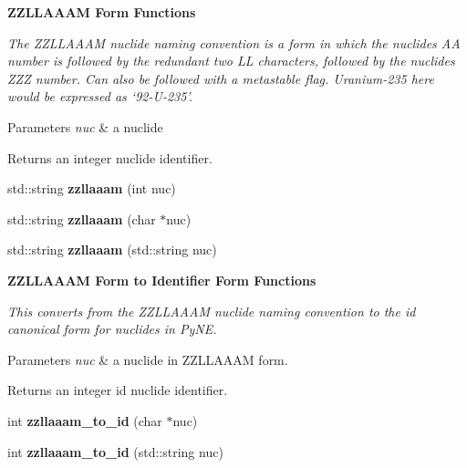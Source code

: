 \begin{Indent}{\bf Z\-Z\-L\-L\-A\-A\-A\-M Form Functions}\par
{\em The Z\-Z\-L\-L\-A\-A\-A\-M nuclide naming convention is a form in which the nuclides A\-A number is followed by the redundant two L\-L characters, followed by the nuclides Z\-Z\-Z number. Can also be followed with a metastable flag. Uranium-\/235 here would be expressed as ‘92-\/\-U-\/235’. 
\begin{DoxyParams}{Parameters}
{\em nuc} & a nuclide \\
\hline
\end{DoxyParams}
\begin{DoxyReturn}{Returns}
an integer nuclide identifier. 
\end{DoxyReturn}
}\begin{DoxyCompactItemize}
\item 
\hypertarget{namespacepyne_1_1nucname_ab11175f9aa7d8f9437b3b43531c94a89}{std\-::string {\bfseries zzllaaam} (int nuc)}\label{namespacepyne_1_1nucname_ab11175f9aa7d8f9437b3b43531c94a89}

\item 
\hypertarget{namespacepyne_1_1nucname_a07ef99280b627f85af2901604b3f6285}{std\-::string {\bfseries zzllaaam} (char $\ast$nuc)}\label{namespacepyne_1_1nucname_a07ef99280b627f85af2901604b3f6285}

\item 
\hypertarget{namespacepyne_1_1nucname_a3e184c78ba73f04348963e2158c32a8d}{std\-::string {\bfseries zzllaaam} (std\-::string nuc)}\label{namespacepyne_1_1nucname_a3e184c78ba73f04348963e2158c32a8d}

\end{DoxyCompactItemize}
\end{Indent}
\begin{Indent}{\bf Z\-Z\-L\-L\-A\-A\-A\-M Form to Identifier Form Functions}\par
{\em This converts from the Z\-Z\-L\-L\-A\-A\-A\-M nuclide naming convention to the id canonical form for nuclides in Py\-N\-E. 
\begin{DoxyParams}{Parameters}
{\em nuc} & a nuclide in Z\-Z\-L\-L\-A\-A\-A\-M form. \\
\hline
\end{DoxyParams}
\begin{DoxyReturn}{Returns}
an integer id nuclide identifier. 
\end{DoxyReturn}
}\begin{DoxyCompactItemize}
\item 
\hypertarget{namespacepyne_1_1nucname_a62543b28a461188a2872582314d4ee05}{int {\bfseries zzllaaam\-\_\-to\-\_\-id} (char $\ast$nuc)}\label{namespacepyne_1_1nucname_a62543b28a461188a2872582314d4ee05}

\item 
\hypertarget{namespacepyne_1_1nucname_a55b0daddcb0ff68650685e50c015f960}{int {\bfseries zzllaaam\-\_\-to\-\_\-id} (std\-::string nuc)}\label{namespacepyne_1_1nucname_a55b0daddcb0ff68650685e50c015f960}

\end{DoxyCompactItemize}
\end{Indent}
